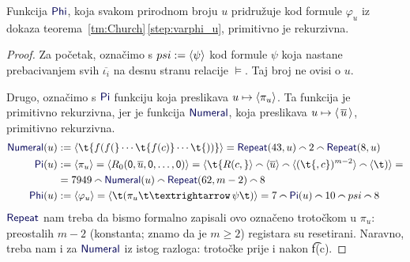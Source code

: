 \begin{lema}[{name=[primitivna rekurzivnost svođenja $K$ na $Valid$]}]
Funkcija $\f{Phi}$, koja svakom prirodnom broju $u$ pridružuje kod formule $\varphi_u$ iz dokaza teorema~\ref{tm:Church}\,\eqref{step:varphi_u}, primitivno je rekurzivna.
\end{lema}
\begin{proof}
    Za početak, označimo s $psi:=\langle\psi\rangle$ kod formule $\psi$ koja nastane prebacivanjem svih $\overline{\iota_i}$ na desnu stranu relacije $\models$. Taj broj ne ovisi o $u$.

Drugo, označimo s $\f{Pi}$ funkciju koja preslikava $u\mapsto\langle\pi_u\rangle$. Ta funkcija je primitivno rekurzivna, jer je funkcija $\f{Numeral}$, koja preslikava $u\mapsto\langle\,\overline u\,\rangle$, primitivno rekurzivna.
\begin{align}
    \f{Numeral}(u)&:=\kr{\t{f(f(}\dotsm\t{f(c)}\dotsm\t{))}}=\f{Repeat}(43,u)\conc{}2\conc{}\f{Repeat}(8,u)\\
    \f{Pi}(u)&:=\kr{\pi_u}=\kr{R_0(\mathsf0,\overline u,\mathsf0,\dotsc,\mathsf0)}=
    \kr{\t{R(c,}}\conc{}\kr{\overline u}\conc{}\kr{(\t{,c})^{m-2}}\conc{}\kr{\t)}=\notag\\
    &=7949\conc{}\f{Numeral}(u)\conc{}\f{Repeat}(62,m-2)\conc{}8\\
    \f{Phi}(u)&:=\kr{\varphi_u}=\kr{\t(\pi_u\!\,\t\textrightarrow\,\psi\t)}=7\conc{}\f{Pi}(u)\conc{}10\conc{}psi\conc{}8
\end{align}
    $\f{Repeat}$ nam treba da bismo formalno zapisali ovo označeno trotočkom u $\pi_u$: preostalih $m-2$ (konstanta; znamo da je $m\ge2$) registara su resetirani. Naravno, treba nam i za $\f{Numeral}$ iz istog razloga: trotočke prije i nakon \t{f(c)}.
\end{proof}

